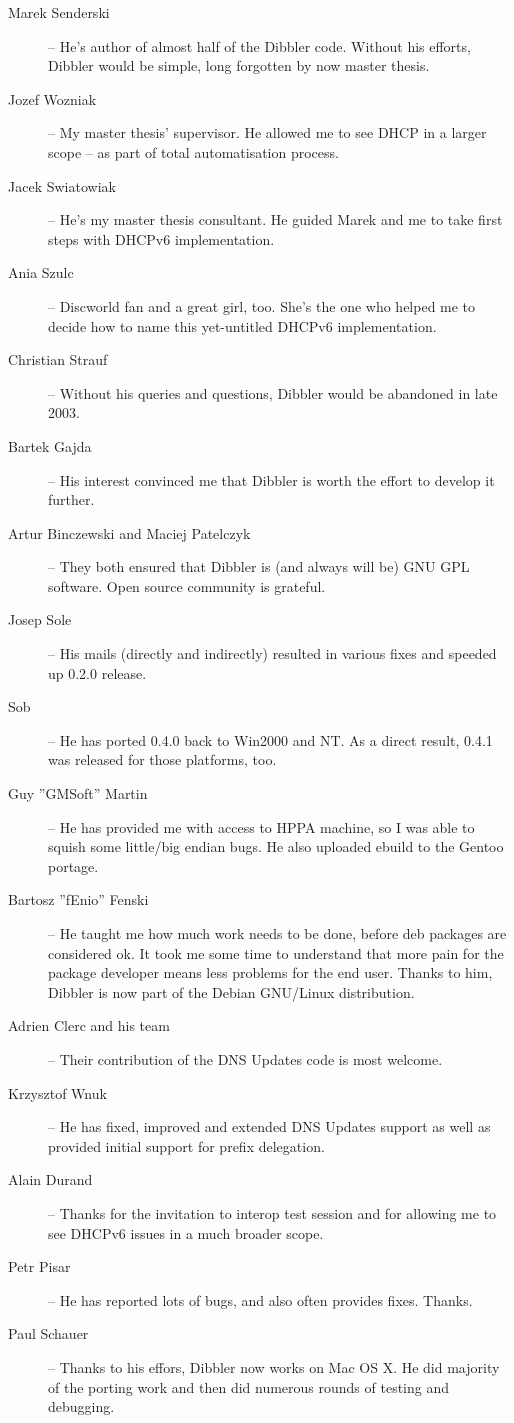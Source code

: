 \begin{description}
\item[Marek Senderski] -- He's author of almost half of the Dibbler
  code. Without his efforts, Dibbler would be simple, long forgotten
  by now master thesis.
\item[Jozef Wozniak] -- My master thesis' supervisor. He allowed me to
  see DHCP in a larger scope -- as part of total automatisation process.
\item[Jacek Swiatowiak] -- He's my master thesis consultant. He guided
  Marek and me to take first steps with DHCPv6 implementation.
\item[Ania Szulc] -- Discworld fan and a great girl, too. She's the one
  who helped me to decide how to name this yet-untitled DHCPv6 implementation.
\item[Christian Strauf] -- Without his queries and questions, Dibbler
  would be abandoned in late 2003.
\item[Bartek Gajda] -- His interest convinced me that Dibbler is worth
  the effort to develop it further.
\item[Artur Binczewski and Maciej Patelczyk] -- They both ensured that
  Dibbler is (and always will be) GNU GPL software. Open source
  community is grateful.
\item[Josep Sole] -- His mails (directly and indirectly) resulted in
  various fixes and speeded up 0.2.0 release.
\item[Sob] -- He has ported 0.4.0 back to Win2000 and NT. As a direct
  result, 0.4.1 was released for those platforms, too.
\item[Guy ''GMSoft'' Martin] -- He has provided me with access to HPPA
  machine, so I was able to squish some little/big endian bugs. He
  also uploaded ebuild to the Gentoo portage.
\item[Bartosz ''fEnio'' Fenski] -- He taught me how much work needs to
  be done, before deb packages are considered ok. It took me some time
  to understand that more pain for the package developer means less
  problems for the end user.  Thanks to him, Dibbler is now part of
  the Debian GNU/Linux distribution.
\item[Adrien Clerc and his team] -- Their contribution of the DNS
  Updates code is most welcome.
\item[Krzysztof Wnuk] -- He has fixed, improved and extended DNS
  Updates support as well as provided initial support for prefix
  delegation.
\item[Alain Durand] -- Thanks for the invitation to interop test
  session and for allowing me to see DHCPv6 issues in a much broader
  scope.
\item[Petr Pisar] -- He has reported lots of bugs, and also often
  provides fixes.  Thanks.
\item[Paul Schauer] -- Thanks to his effors, Dibbler now works on Mac
  OS X. He did majority of the porting work and then did numerous
  rounds of testing and debugging.
\end{description}

